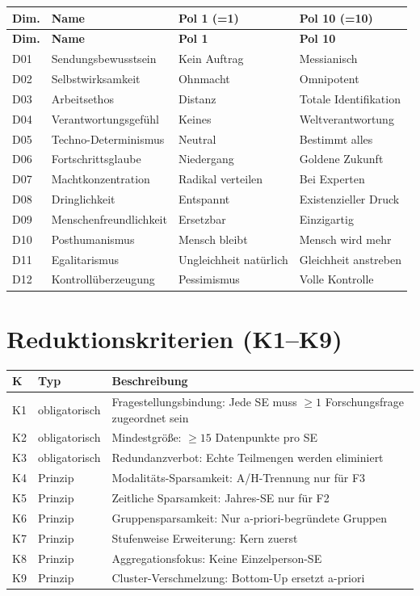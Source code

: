 \documentclass[12pt,a4paper]{article}
\begin{document}
\begin{longtable}{l l l l}
  \toprule
  \textbf{Dim.} & \textbf{Name} & \textbf{Pol 1 (=1)} & \textbf{Pol 10 (=10)} \\
  \midrule
  \endfirsthead
  \toprule
  \textbf{Dim.} & \textbf{Name} & \textbf{Pol 1} & \textbf{Pol 10} \\
  \midrule
  \endhead
  D01 & Sendungsbewusstsein & Kein Auftrag & Messianisch \\
  D02 & Selbstwirksamkeit & Ohnmacht & Omnipotent \\
  D03 & Arbeitsethos & Distanz & Totale Identifikation \\
  D04 & Verantwortungsgef\"uhl & Keines & Weltverantwortung \\
  D05 & Techno-Determinismus & Neutral & Bestimmt alles \\
  D06 & Fortschrittsglaube & Niedergang & Goldene Zukunft \\
  D07 & Machtkonzentration & Radikal verteilen & Bei Experten \\
  D08 & Dringlichkeit & Entspannt & Existenzieller Druck \\
  D09 & Menschenfreundlichkeit & Ersetzbar & Einzigartig \\
  D10 & Posthumanismus & Mensch bleibt & Mensch wird mehr \\
  D11 & Egalitarismus & Ungleichheit nat\"urlich & Gleichheit anstreben \\
  D12 & Kontroll\"uberzeugung & Pessimismus & Volle Kontrolle \\
  \bottomrule
\end{longtable}


\section{Reduktionskriterien (K1--K9)}
\label{app:reduktion}

\begin{longtable}{l l p{8cm}}
  \toprule
  \textbf{K} & \textbf{Typ} & \textbf{Beschreibung} \\
  \midrule
  \endfirsthead
  K1 & obligatorisch & Fragestellungsbindung: Jede SE muss $\geq 1$ Forschungsfrage zugeordnet sein \\
  K2 & obligatorisch & Mindestgr\"o\ss{}e: $\geq 15$ Datenpunkte pro SE \\
  K3 & obligatorisch & Redundanzverbot: Echte Teilmengen werden eliminiert \\
  K4 & Prinzip & Modalit\"ats-Sparsamkeit: A/H-Trennung nur f\"ur F3 \\
  K5 & Prinzip & Zeitliche Sparsamkeit: Jahres-SE nur f\"ur F2 \\
  K6 & Prinzip & Gruppensparsamkeit: Nur a-priori-begr\"undete Gruppen \\
  K7 & Prinzip & Stufenweise Erweiterung: Kern zuerst \\
  K8 & Prinzip & Aggregationsfokus: Keine Einzelperson-SE \\
  K9 & Prinzip & Cluster-Verschmelzung: Bottom-Up ersetzt a-priori \\
  \bottomrule
\end{longtable}
\end{document}
